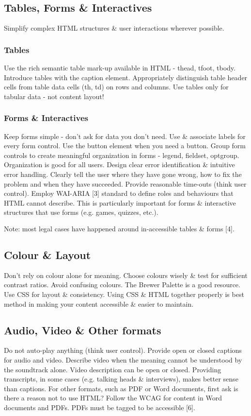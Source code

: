 \documentclass{acm_proc_article-sp}
\begin{document}
\subsection{Tables, Forms \& Interactives}
Simplify complex HTML structures \& user interactions wherever possible.
\subsubsection{Tables}
Use the rich semantic table mark-up available in HTML - thead, tfoot, tbody. Introduce tables with the caption element. Appropriately distinguish table header cells from table data cells (th, td) on rows and columns. Use tables only for tabular data - not content layout!

\subsubsection{Forms \& Interactives}
Keep forms simple - don't ask for data you don't need. Use \& associate labels for every form control. Use the button element when you need a button. Group form controls to create meaningful organization in forms - legend, fieldset, optgroup. Organization is good for all users. Design clear error identification \& intuitive error handling. Clearly tell the user where they have gone wrong, how to fix the problem and when they have succeeded. Provide reasonable time-outs (think user control). Employ WAI-ARIA [3] standard to define roles and behaviours that HTML cannot describe. This is particularly important for forms \& interactive structures that use forms (e.g. games, quizzes, etc.).

Note: most legal cases have happened around in-accessible tables \& forms [4].

\subsection{Colour \& Layout}
Don't rely on colour alone for meaning. Choose colours wisely \& test for sufficient contrast ratios. Avoid confusing colours. The Brewer Palette is a good resource. Use CSS for layout  \& consistency. Using CSS \& HTML together properly is best method in making your content accessible \& easier to maintain.

\subsection{Audio, Video \& Other formats}
Do not auto-play anything (think user control). Provide open or closed captions for audio and video. Describe video when the meaning cannot be understood by the soundtrack alone. Video description can be open or closed. Providing transcripts, in some cases (e.g. talking heads \& interviews), makes better sense than captions. For other formats, such as PDF or Word documents, first ask is there a reason not to use HTML? Follow the WCAG for content in Word documents and PDFs. PDFs must be tagged to be accessible [6].
\end{document}
